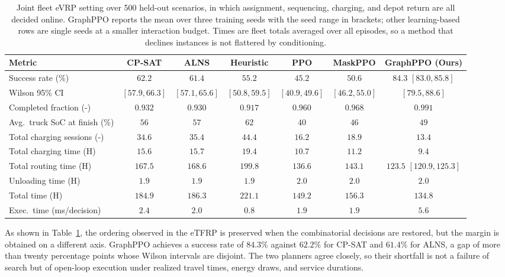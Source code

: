 \documentclass[journal]{IEEEtran}
\begin{document}
\begin{table}[t]
\centering
\small
\caption{Joint fleet eVRP setting over 500 held-out scenarios, in which assignment, sequencing, charging, and depot return are all decided online. GraphPPO reports the mean over three training seeds with the seed range in brackets; other learning-based rows are single seeds at a smaller interaction budget. Times are fleet totals averaged over all episodes, so a method that declines instances is not flattered by conditioning.}
\begin{tabular}{@{}lcccccc@{}}
\toprule
Metric & CP-SAT & ALNS & Heuristic & PPO & MaskPPO & GraphPPO (Ours) \\
\midrule
Success rate (\%) & $62.2$ & $61.4$ & $55.2$ & $45.2$ & $50.6$ & $\mathbf{84.3}$ $[83.0, 85.8]$ \\
Wilson 95\% CI & $[57.9, 66.3]$ & $[57.1, 65.6]$ & $[50.8, 59.5]$ & $[40.9, 49.6]$ & $[46.2, 55.0]$ & $[79.5, 88.6]$ \\
Completed fraction (-) & $0.932$ & $0.930$ & $0.917$ & $0.960$ & $0.968$ & $\mathbf{0.991}$ \\
Avg.\ truck SoC at finish (\%) & $56$ & $57$ & $62$ & $40$ & $46$ & $49$ \\
Total charging sessions (-) & $34.6$ & $35.4$ & $44.4$ & $16.2$ & $18.9$ & $\mathbf{13.4}$ \\
\midrule
Total charging time (H) & $15.6$ & $15.7$ & $19.4$ & $10.7$ & $11.2$ & $\mathbf{9.4}$ \\
Total routing time (H) & $167.5$ & $168.6$ & $199.8$ & $136.6$ & $143.1$ & $\mathbf{123.5}$ $[120.9, 125.3]$ \\
Unloading time (H) & $1.9$ & $1.9$ & $1.9$ & $2.0$ & $2.0$ & $2.0$ \\
Total time (H) & $184.9$ & $186.3$ & $221.1$ & $149.2$ & $156.3$ & $\mathbf{134.8}$ \\
\midrule
Exec.\ time (ms/decision) & $2.4$ & $2.0$ & $\mathbf{0.8}$ & $1.9$ & $1.9$ & $5.6$ \\
\bottomrule
\end{tabular}
\label{tab:joint_evrp_metrics}
\end{table}

As shown in Table~\ref{tab:joint_evrp_metrics}, the ordering observed in the eTFRP is preserved when the combinatorial decisions are restored, but the margin is obtained on a different axis.  GraphPPO achieves a success rate of $84.3\%$ against $62.2\%$ for CP-SAT and $61.4\%$ for ALNS, a gap of more than twenty percentage points whose Wilson intervals are disjoint. The two planners agree closely, so their shortfall is not a failure of search but of open-loop execution under realized travel times, energy draws, and service durations.
\end{document}
